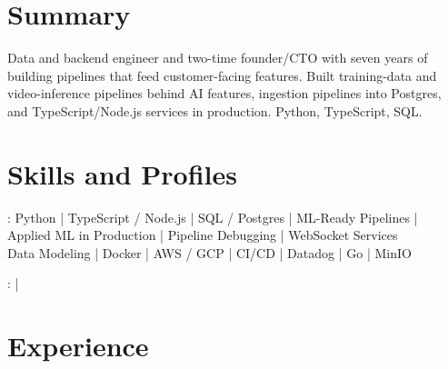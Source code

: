 \documentclass[print]{jack-resume}
\begin{document}
\pagecolor{darkmodeBackground}


\begin{minipage}[t][1cm][t]{.03\textwidth}
    \hfill
\end{minipage}

\section{Summary}
Data and backend engineer and two-time founder/CTO with seven years of building pipelines that feed customer-facing features. Built training-data and video-inference pipelines behind AI features, ingestion pipelines into Postgres, and TypeScript/Node.js services in production. Python, TypeScript, SQL.
\sectionsep

\section{Skills and Profiles}
:
Python \hfill | \hfill
TypeScript / Node.js \hfill | \hfill
SQL / Postgres \hfill | \hfill
ML-Ready Pipelines \hfill | \hfill
Applied ML in Production \hfill | \hfill
Pipeline Debugging \hfill | \hfill
WebSocket Services \\
\hspace{1.0cm} Data Modeling \hfill | \hfill
Docker \hfill | \hfill
AWS / GCP \hfill | \hfill
CI/CD \hfill | \hfill
Datadog \hfill | \hfill
Go \hfill | \hfill
MinIO \\

\raggedright{
    :
      \href{https://www.linkedin.com/in/jack-sturtevant/}{ \ExternalLink} |
     \href{https://github.com/jacksturt}{ \ExternalLink}}

\section{Experience}
\end{document}

